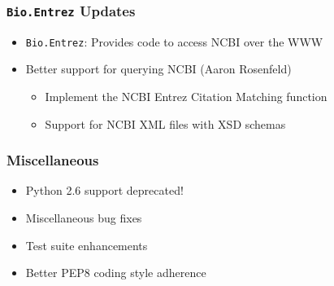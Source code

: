 \documentclass[trans]{beamer}
\begin{document}
\frame
{
  \frametitle{\texttt{Bio.Entrez} Updates}
  
  \begin{itemize}
  \item \texttt{Bio.Entrez}: Provides code to access NCBI over the WWW
  \item Better support for querying NCBI (Aaron Rosenfeld)
  \begin{itemize}
  \item Implement the NCBI Entrez Citation Matching function
  \item Support for NCBI XML files with XSD schemas
  \end{itemize}
  \end{itemize}
  
  
}

\frame
{
  \frametitle{Miscellaneous}

  \begin{itemize}
  \item Python 2.6 support deprecated!
  \item Miscellaneous bug fixes
  \item Test suite enhancements
  \item Better PEP8 coding style adherence
  \end{itemize}
}
\end{document}
